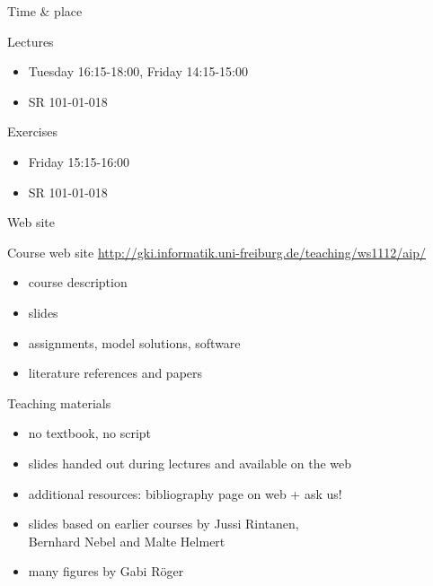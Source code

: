 \documentclass{gkibeamer}
\begin{document}
\begin{frame}{Time \& place}
  \begin{block}{Lectures}
    \begin{itemize}
    \item {} Tuesday 16:15-18:00, Friday 14:15-15:00
    \item {} SR 101-01-018
    \end{itemize}
  \end{block}

  \begin{block}{Exercises}
    \begin{itemize}
    \item {} Friday 15:15-16:00
    \item {} SR 101-01-018
    \end{itemize}
  \end{block}
\end{frame}

\begin{frame}{Web site}
  \begin{block}{Course web site}
    {\footnotesize\url{http://gki.informatik.uni-freiburg.de/teaching/ws1112/aip/}}
    \begin{itemize}
    \item {} course description
    \item {} slides
    \item {} assignments, model solutions,
      software
    \item {} literature references and
      papers
    \end{itemize}
  \end{block}
\end{frame}

\begin{frame}{Teaching materials}
  \begin{itemize}
  \item no textbook, no script
  \item slides handed out during lectures and available on the web
  \item additional resources: bibliography page on web +
    \alert{ask us!}
  \end{itemize}

  \bigskip

  \begin{itemize}
  \item slides based on earlier courses by Jussi Rintanen, \\
    Bernhard Nebel and Malte Helmert
  \item many figures by Gabi R\"oger
  \end{itemize}
\end{frame}
\end{document}

